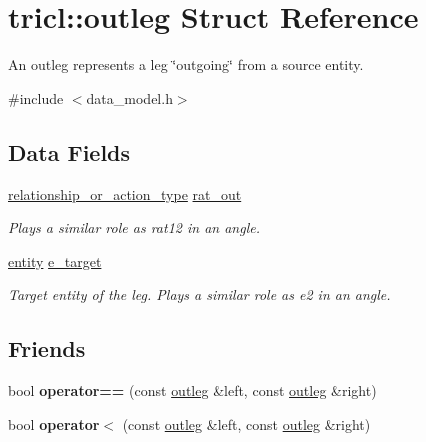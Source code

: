 \hypertarget{structtricl_1_1outleg}{}\section{tricl\+:\+:outleg Struct Reference}
\label{structtricl_1_1outleg}


An outleg represents a leg \char`\"{}outgoing\char`\"{} from a source entity.  




{\ttfamily \#include $<$data\+\_\+model.\+h$>$}

\subsection*{Data Fields}
\begin{DoxyCompactItemize}
\item 
\mbox{\label{structtricl_1_1outleg_a126702ea981b412b0536b34457e92f45}} 
\hyperlink{namespacetricl_a2d01894944fb58a8fedc0912a48d13f8}{relationship\+\_\+or\+\_\+action\+\_\+type} \hyperlink{structtricl_1_1outleg_a126702ea981b412b0536b34457e92f45}{rat\+\_\+out}
\begin{DoxyCompactList}\small\item\em Plays a similar role as {\ttfamily rat12} in an angle. \end{DoxyCompactList}\item 
\mbox{\label{structtricl_1_1outleg_a7329dd10bd2213695049e0b816ab34ce}} 
\hyperlink{namespacetricl_a57273122278e8b301844e2a2e1f0742f}{entity} \hyperlink{structtricl_1_1outleg_a7329dd10bd2213695049e0b816ab34ce}{e\+\_\+target}
\begin{DoxyCompactList}\small\item\em Target entity of the leg. Plays a similar role as {\ttfamily e2} in an angle. \end{DoxyCompactList}\end{DoxyCompactItemize}
\subsection*{Friends}
\begin{DoxyCompactItemize}
\item 
\mbox{\label{structtricl_1_1outleg_a925572d2a4bc56d312134f995f7790a5}} 
bool {\bfseries operator==} (const \hyperlink{structtricl_1_1outleg}{outleg} \&left, const \hyperlink{structtricl_1_1outleg}{outleg} \&right)
\item 
\mbox{\label{structtricl_1_1outleg_a594b6be76b1271da95305f64d3f28f52}} 
bool {\bfseries operator$<$} (const \hyperlink{structtricl_1_1outleg}{outleg} \&left, const \hyperlink{structtricl_1_1outleg}{outleg} \&right)
\end{DoxyCompactItemize}


